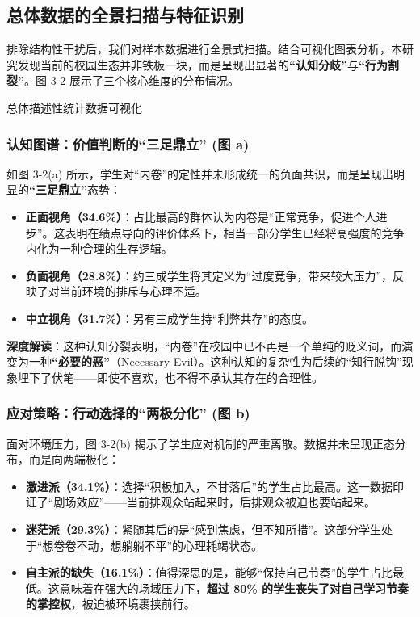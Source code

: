 \documentclass[win,thesis]{hustreport} %
\begin{document}
\subsection{总体数据的全景扫描与特征识别}

排除结构性干扰后，我们对样本数据进行全景式扫描。结合可视化图表分析，本研究发现当前的校园生态并非铁板一块，而是呈现出显著的\textbf{“认知分歧”}与\textbf{“行为割裂”}。图 3-2 展示了三个核心维度的分布情况。

\begin{parallelfigures}{总体描述性统计数据可视化}
\end{parallelfigures}

\subsubsection*{认知图谱：价值判断的“三足鼎立” (图 a)}
如图 3-2(a) 所示，学生对“内卷”的定性并未形成统一的负面共识，而是呈现出明显的\textbf{“三足鼎立”}态势：
\begin{itemize}
	\item \textbf{正面视角（34.6\%）}：占比最高的群体认为内卷是“正常竞争，促进个人进步”。这表明在绩点导向的评价体系下，相当一部分学生已经将高强度的竞争内化为一种合理的生存逻辑。
	\item \textbf{负面视角（28.8\%）}：约三成学生将其定义为“过度竞争，带来较大压力”，反映了对当前环境的排斥与心理不适。
	\item \textbf{中立视角（31.7\%）}：另有三成学生持“利弊共存”的态度。
\end{itemize}
\textbf{深度解读}：这种认知分裂表明，“内卷”在校园中已不再是一个单纯的贬义词，而演变为一种\textbf{“必要的恶”}（Necessary Evil）。这种认知的复杂性为后续的“知行脱钩”现象埋下了伏笔——即使不喜欢，也不得不承认其存在的合理性。

\subsubsection*{应对策略：行动选择的“两极分化” (图 b)}
面对环境压力，图 3-2(b) 揭示了学生应对机制的严重离散。数据并未呈现正态分布，而是向两端极化：
\begin{itemize}
	\item \textbf{激进派（34.1\%）}：选择“积极加入，不甘落后”的学生占比最高。这一数据印证了“剧场效应”——当前排观众站起来时，后排观众被迫也要站起来。
	\item \textbf{迷茫派（29.3\%）}：紧随其后的是“感到焦虑，但不知所措”。这部分学生处于“想卷卷不动，想躺躺不平”的心理耗竭状态。
	\item \textbf{自主派的缺失（16.1\%）}：值得深思的是，能够“保持自己节奏”的学生占比最低。这意味着在强大的场域压力下，\textbf{超过 80\% 的学生丧失了对自己学习节奏的掌控权}，被迫被环境裹挟前行。
\end{itemize}
\end{document}
